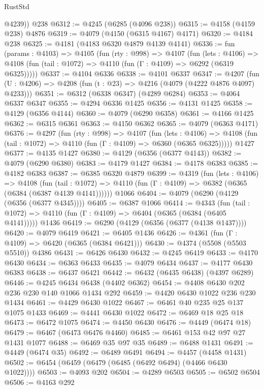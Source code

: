 \begin{lexlean}{RustStd}
\begin{coremodule}
        @4239))
    @238
@6312 := @4245 (@6285 (@4096 @238))
@6315 := @4158 (@4159 @238) @4876
@6319 := @4079 (@4150 (@6315 @4167) @4171)
@6320 := @4184 @238
@6325 := @4181 (@4183 @6320 @4879 @4139 @4141)
@6336 := fun (params : @4103) =>
  @4105
    (fun (rty : @998) =>
    @4107
      (fun (lets : @4106) =>
      @4108 (fun (tail : @1072) => @4110 (fun (Γ : @4109) => @6292 (@6319 @6325)))))
@6337 := @4104 @6336
@6338 := @4101 @6337
@6347 := @4207 (fun (U : @4206) => @4208 (fun (t : @23) => @4216 (@4079 (@4222 @4876 @4097) @4233)))
@6351 := @6312 (@6338 @6347) (@4289 @6284)
@6353 := @4064 @6337 @6347
@6355 := @4294 @6336 @1425
@6356 := @4131 @1425
@6358 := @4129 (@6356 @4144)
@6360 := @4079 (@6290 @6358)
@6361 := @4166 @1425
@6362 := @6315 @6361
@6363 := @4150 @6362
@6365 := @4079 (@6363 @4171)
@6376 := @4297
    (fun (rty : @998) =>
    @4107
      (fun (lets : @4106) =>
      @4108 (fun (tail : @1072) => @4110 (fun (Γ : @4109) => @6360 (@6365 @6325)))))
    @1427
@6377 := @4135 @1427
@6380 := @4129 (@6356 (@6377 @4143))
@6382 := @4079 (@6290 @6380)
@6383 := @4179 @1427
@6384 := @4178 @6383
@6385 := @4182 @6383
@6387 := @6385 @6320 @4879
@6399 := @4319
    (fun (lets : @4106) =>
    @4108
      (fun (tail : @1072) => @4110 (fun (Γ : @4109) => @6382 (@6365 (@6384 (@6387 @4139 @4141))))))
    @1066
@6404 := @4079 (@6290 (@4129 (@6356 (@6377 @4345))))
@6405 := @6387 @1066
@6414 := @4343
    (fun (tail : @1072) => @4110 (fun (Γ : @4109) => @6404 (@6365 (@6384 (@6405 @4141)))))
    @1436
@6419 := @6290 (@4129 (@6356 (@6377 (@4138 @1437))))
@6420 := @4079 @6419
@6421 := @6405 @1436
@6426 := @4361 (fun (Γ : @4109) => @6420 (@6365 (@6384 @6421)))
@6430 := @4374 (@5508 (@5503 @5510)) @4386
@6431 := @6426 @6430
@6432 := @4245 @6419
@6433 := @4170 @6430
@6434 := @6363 @6433
@6435 := @4079 @6434
@6437 := @4177 @6430 @6383
@6438 := @6437 @6421
@6442 := @6432 (@6435 @6438) (@4397 @6289)
@6446 := @4245 @6434 @6438 (@4402 @6362)
@6454 := @4408 @6430 @202 @236 @230 @140 @1066 @1434 @292
@6459 := @4420 @6430 @1022 @236 @230 @1434
@6461 := @4429 @6430 @1022
@6467 := @6461 @40 @235 @25 @137 @1075 @1433
@6469 := @4441 @6430 @1022
@6472 := @6469 @18 @25 @18
@6473 := @6472 @1075
@6474 := @4450 @6430
@6476 := @4449 (@6474 @18)
@6479 := @6467 (@6473 @6476 @4460)
@6485 := @6461 @153 @42 @97 @27 @1431 @1077
@6488 := @6469 @35 @97 @35
@6489 := @6488 @1431
@6491 := @4449 (@6474 @35)
@6492 := @6489 @6491
@6494 := @4457 (@4458 @1431)
@6502 := @6454 (@6459 (@6479 (@6485 (@6492 @6494) (@4466 @6430 @1022))))
@6503 := @4093 @202
@6504 := @4289 @6503
@6505 := @6502 @6504
@6506 := @4163 @292

\end{coremodule}
\end{lexlean}
